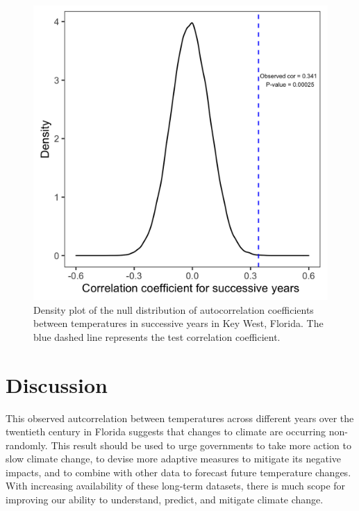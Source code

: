 \documentclass{article}
\begin{document}
\begin{figure}[htbp]
\begin{minipage}{.5\textwidth}
        \includegraphics[scale=0.8]{../results/PermuCorCoeff_TAutoCorr.png}
        \caption{Density plot of the null distribution of autocorrelation coefficients between temperatures in successive years in Key West, Florida. 
        The blue dashed line represents the test correlation coefficient.}
        \label{fig:test2}
    \end{minipage}
    \end{figure}\vspace{-1.5em}

\section{Discussion \vspace{-0.5em}}

    This observed autcorrelation between temperatures across different years over the twentieth century in Florida suggests that changes to climate 
    are occurring non-randomly. This result should be used to urge governments to take more action to slow climate change, to devise more adaptive 
    measures to mitigate its negative impacts, and to combine with other data to forecast future temperature changes. With increasing availability 
    of these long-term datasets, there is much scope for improving our ability to understand, predict, and mitigate climate change. \vspace{-1em}
    


	
	
\end{document}
